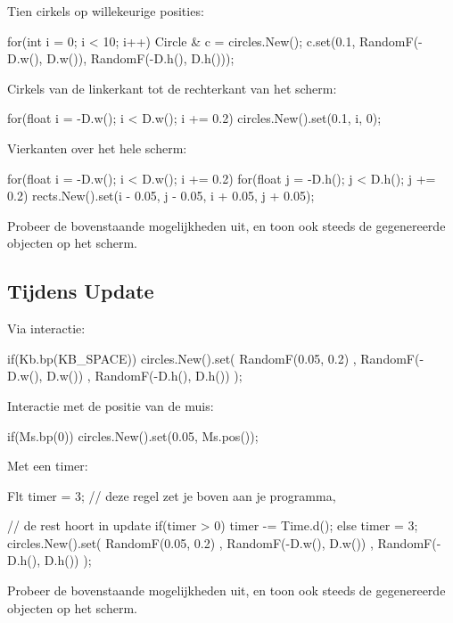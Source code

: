 Tien cirkels op willekeurige posities:

\begin{code}
for(int i = 0; i < 10; i++)
{
	Circle & c = circles.New();
	c.set(0.1, RandomF(-D.w(), D.w()), RandomF(-D.h(), D.h()));
}
\end{code}

Cirkels van de linkerkant tot de rechterkant van het scherm:

\begin{code}
for(float i = -D.w(); i < D.w(); i += 0.2) {
  circles.New().set(0.1, i, 0);
}
\end{code}

Vierkanten over het hele scherm:
\begin{code}
for(float i = -D.w(); i < D.w(); i += 0.2)
{
	for(float j = -D.h();  j < D.h();  j += 0.2)
	{
		 rects.New().set(i - 0.05, j - 0.05, i + 0.05, j + 0.05);
	}     
}
\end{code}

\begin{exercise}
Probeer de bovenstaande mogelijkheden uit, en toon ook steeds de gegenereerde objecten op het scherm.
\end{exercise}

\subsection{Tijdens Update}

Via interactie:
\begin{code}
if(Kb.bp(KB_SPACE)) {
  circles.New().set(  RandomF(0.05, 0.2)
	                  , RandomF(-D.w(), D.w())
	                  , RandomF(-D.h(), D.h())
  );
}
\end{code}

Interactie met de positie van de muis:

\begin{code}
if(Ms.bp(0)) {
  circles.New().set(0.05, Ms.pos());
}
\end{code}

Met een timer:
\begin{code}
Flt timer = 3; // deze regel zet je boven aan je programma, 
               
// de rest hoort in update
if(timer > 0) timer -= Time.d();
else {
  timer = 3;
	circles.New().set(  RandomF(0.05, 0.2)
	                  , RandomF(-D.w(), D.w())
										, RandomF(-D.h(), D.h())
  );
}
\end{code}

\begin{exercise}
Probeer de bovenstaande mogelijkheden uit, en toon ook steeds de gegenereerde objecten op het scherm.
\end{exercise}

